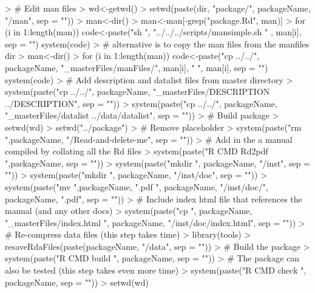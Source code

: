 \documentclass{article}
\renewenvironment{Schunk}{\vspace{\topsep}}{\vspace{\topsep}}
\begin{document}
\begin{Schunk}
\begin{Sinput}
> # Edit man files
> wd<-getwd()
> setwd(paste(dir, "package/", packageName, "/man", sep = ""))
> man<-dir()
> man<-man[-grep("package.Rd", man)]
> for (i in 1:length(man)){
   code<-paste("sh ", "../../../scripts/mansimple.sh " , man[i], sep = "")
   system(code)
 }
> # alternative is to copy the man files from the manfiles dir
> man<-dir()
> for (i in 1:length(man)){
   code<-paste("cp ../../", packageName,
               "_masterFiles/manFiles/", man[i],
               " ", man[i], sep = "")
   system(code)
   }
> # Add description and datalist files from master directory
> system(paste("cp ../../", packageName,
              "_masterFiles/DESCRIPTION ../DESCRIPTION", sep = ""))
> system(paste("cp ../../", packageName,
              "_masterFiles/datalist ../data/datalist", sep = ""))
> # Build package
> setwd(wd)
> setwd("../package")
> # Remove placeholder
> system(paste("rm ",packageName, "/Read-and-delete-me", sep = ""))
> # Add in the a manual compiled by collating all the Rd files
> system(paste("R CMD Rd2pdf ",packageName, sep = ""))
> system(paste("mkdir ", packageName, "/inst", sep = ""))
> system(paste("mkdir ", packageName, "/inst/doc", sep = ""))
> system(paste("mv ",packageName, ".pdf ", packageName, "/inst/doc/",
              packageName, ".pdf", sep = ""))
> # Include index html file that references the manual (and any other docs)
> system(paste("cp ", packageName, "_masterFiles/index.html ",
              packageName, "/inst/doc/index.html", sep = ""))
> # Re-compress data files (this step takes time)
> library(tools)
> resaveRdaFiles(paste(packageName, "/data", sep = ""))
> # Build the package
> system(paste("R CMD build ", packageName, sep = ""))
> # The package can also be tested (this step takes even more time)
> system(paste("R CMD check ", packageName, sep = ""))
> setwd(wd)
\end{Sinput}
\end{Schunk}
\end{document}

